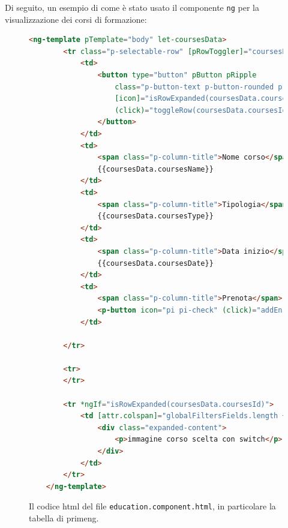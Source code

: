 Di seguito, un esempio di come è stato usato il componente \texttt{ng} per la visualizzazione dei corsi di formazione:
\begin{figure}[H]
\centering
\begin{lstlisting}[language=HTML, linewidth=20cm, basicstyle=\tiny]
  <ng-template pTemplate="body" let-coursesData>
        <tr class="p-selectable-row" [pRowToggler]="coursesData.coursesId">
            <td>
                <button type="button" pButton pRipple
                    class="p-button-text p-button-rounded p-button-plain"
                    [icon]="isRowExpanded(coursesData.coursesId) ? 'pi pi-chevron-down' : 'pi pi-chevron-right'"
                    (click)="toggleRow(coursesData.coursesId)">
                </button>
            </td>
            <td>
                <span class="p-column-title">Nome corso</span>
                {{coursesData.coursesName}}
            </td>
            <td>
                <span class="p-column-title">Tipologia</span>
                {{coursesData.coursesType}}
            </td>
            <td>
                <span class="p-column-title">Data inizio</span>
                {{coursesData.coursesDate}}
            </td>
            <td>
                <span class="p-column-title">Prenota</span>
                <p-button icon="pi pi-check" (click)="addEnrollment(coursesData);"></p-button>
            </td>

        </tr>

        <tr>
        </tr>

        <tr *ngIf="isRowExpanded(coursesData.coursesId)">
            <td [attr.colspan]="globalFiltersFields.length + 1">
                <div class="expanded-content">
                    <p>immagine corso scelta con switch</p>
                </div>
            </td>
        </tr>
    </ng-template>
\end{lstlisting}
\caption{\label{fig:primeng ng}Il codice \acrshort{html} del file \texttt{education.component.html}, in particolare la tabella di \acrshort{primeng}.}
\end{figure}


